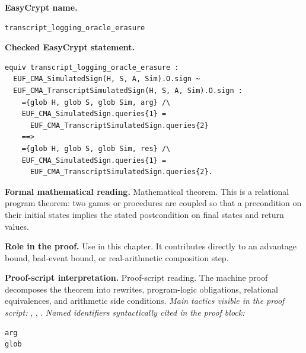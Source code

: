\begin{formaltheorem}
\noindent\textbf{EasyCrypt name.}
\begin{lstlisting}[language=EasyCrypt,basicstyle=\ttfamily\scriptsize]
transcript_logging_oracle_erasure
\end{lstlisting}
\noindent\textbf{Checked EasyCrypt statement.}
\begin{lstlisting}[language=EasyCrypt,basicstyle=\ttfamily\scriptsize]
equiv transcript_logging_oracle_erasure :
  EUF_CMA_SimulatedSign(H, S, A, Sim).O.sign ~
  EUF_CMA_TranscriptSimulatedSign(H, S, A, Sim).O.sign :
    ={glob H, glob S, glob Sim, arg} /\
    EUF_CMA_SimulatedSign.queries{1} =
      EUF_CMA_TranscriptSimulatedSign.queries{2}
    ==>
    ={glob H, glob S, glob Sim, res} /\
    EUF_CMA_SimulatedSign.queries{1} =
      EUF_CMA_TranscriptSimulatedSign.queries{2}.
\end{lstlisting}
\noindent\textbf{Formal mathematical reading.}
Mathematical theorem. This is a relational program theorem: two games or procedures are coupled so that a precondition on their initial states implies the stated postcondition on final states and return values.

\noindent\textbf{Role in the proof.}
Use in this chapter. It contributes directly to an advantage bound, bad-event bound, or real-arithmetic composition step.

\noindent\textbf{Proof-script interpretation.}
Proof-script reading. The machine proof decomposes the theorem into rewrites, program-logic obligations, relational equivalences, and arithmetic side conditions.
\emph{Main tactics visible in the proof script:} , , .
\emph{Named identifiers syntactically cited in the proof block:}
\begin{lstlisting}[language=EasyCrypt,basicstyle=\ttfamily\scriptsize]
arg
glob
\end{lstlisting}

\end{formaltheorem}

